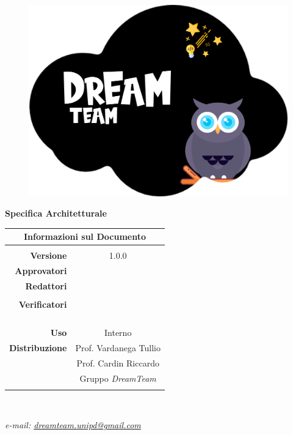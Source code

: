 
\begin{center}

\begin{figure}
\centering
\includegraphics[scale=0.05]{Contenuto/Immagini/DreamTeam.png} 
\end{figure}

{\Huge{\textbf{Specifica Architetturale}}} \\ [1cm]
\begin{table}[htbp]
\centering
\begin{tabular}{r|c}
\multicolumn{2}{c}{\textbf{Informazioni sul Documento}} \\
\hline \\
\textbf{Versione} & 1.0.0 \\ \rule{0pt}{3ex}    
\textbf{Approvatori} & \EP{} \\ \rule{0pt}{3ex}      
\textbf{Redattori} & \MG{} \\ \rule{0pt}{2ex}   
& \PV{} \\ \rule{0pt}{3ex}    
\textbf{Verificatori} & \EP{} \\ \rule{0pt}{2ex}   
& \FP{} \\ \rule{0pt}{2ex}   
& \GC{} \\ \rule{0pt}{2ex}
& \LW{} \\ \rule{0pt}{2ex} 
& \MB{} \\ \rule{0pt}{3ex}        
\textbf{Uso} & Interno \\ \rule{0pt}{3ex}    
\textbf{Distribuzione} & Prof. Vardanega Tullio \\ \rule{0pt}{2ex}   
& Prof. Cardin Riccardo \\ \rule{0pt}{2ex}   
& Gruppo \textit{DreamTeam} \\ \rule{0pt}{0.1cm}   
\end{tabular} \\ [0.5cm]
\end{table}

\textsl{ e-mail: \href{mailto:dreamteam.unipd@gmail.com}{dreamteam.unipd@gmail.com} } \\[2cm]
\end{center}
\pagebreak